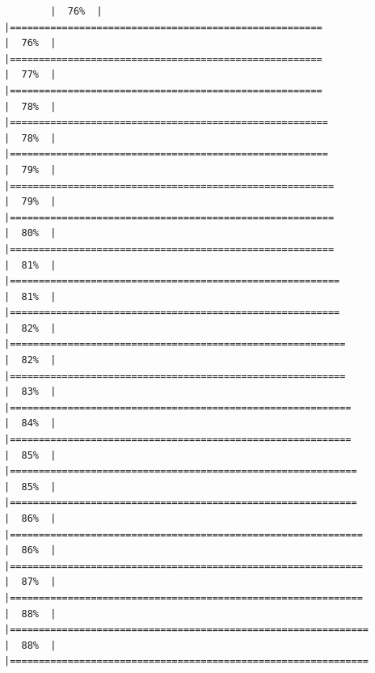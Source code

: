 \documentclass[
]{article}
\begin{document}
\begin{verbatim}
        |  76%  |                                                                              |======================================================                |  76%  |                                                                              |======================================================                |  77%  |                                                                              |======================================================                |  78%  |                                                                              |=======================================================               |  78%  |                                                                              |=======================================================               |  79%  |                                                                              |========================================================              |  79%  |                                                                              |========================================================              |  80%  |                                                                              |========================================================              |  81%  |                                                                              |=========================================================             |  81%  |                                                                              |=========================================================             |  82%  |                                                                              |==========================================================            |  82%  |                                                                              |==========================================================            |  83%  |                                                                              |===========================================================           |  84%  |                                                                              |===========================================================           |  85%  |                                                                              |============================================================          |  85%  |                                                                              |============================================================          |  86%  |                                                                              |=============================================================         |  86%  |                                                                              |=============================================================         |  87%  |                                                                              |=============================================================         |  88%  |                                                                              |==============================================================        |  88%  |                                                                              |============================================================== 
\end{verbatim}
\end{document}
